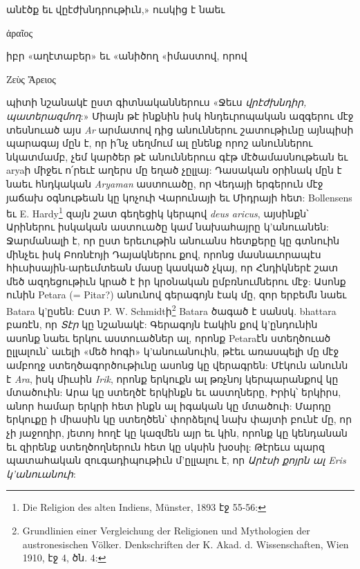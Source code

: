 \documentclass{article}
\begin{document}
{անէծք եւ վըէժխնդրութիւն,» ուսկից է նաեւ \begin{greek}ἀραῖος\end{greek} իբր «աղէտաբեր» եւ «անիծող «իմաստով, որով \begin{greek}Ζεὺς Ἄρειος\end{greek} պիտի նշանակէ ըստ գիտնականներուս «Ջեւս \emph{վրէժխնդիր, պատերազմող}:» Միայն թէ ինքնին իսկ հնդեւրոպական ազգերու մէջ տեսնուած այս \emph{Ar} արմատով դից անուններու շատութիւնը այնպիսի պարագայ մըն է, որ ի՛նչ սեղմում ալ ընենք որոշ անուններու նկատմամբ, չեմ կարծեր թէ անուններուս գէթ մէծամասնութեան եւ aryaի միջեւ ո՛րեւէ աղերս մը եղած չըլլայ: Դասական օրինակ մըն է նաեւ հնդկական \emph{Aryaman} աստուածը, որ Վեդայի երգերուն մէջ յաճախ օգնութեան կը կոչուի Վարունայի եւ Միդրայի հետ: Bollensens եւ E. Hardy\footnote{Die Religion des alten Indiens, Münster, 1893 էջ 55-56:} զայն շատ գեղեցիկ կերպով \emph{deus aricus}, այսինքն՝ Արիներու իսկական աստուածը կամ նախահայրը կ'անուանեն: Ջարմանալի է, որ ըստ երեւութին անուանս հետքերը կը գտնուին մինչեւ իսկ Բոռնէոյի Դայակներու քով, որոնց մասնաւորապէս հիւսիսային-արեւմտեան մասը կասկած չկայ, որ Հնդիկներէ շատ մեծ ազդեցութիւն կրած է իր կրօնական ըմբռնումներու մէջ: Ասոնք ունին Petara (= Pitar?) անունով գերագոյն էակ մը, զոր երբեմն նաեւ Batara կ'ըսեն: Ըստ P. W. Schmidtի\footnote{Grundlinien einer Vergleichung der Religionen und Mythologien der austronesischen Völker. Denkschriften der K. Akad. d. Wissenschaften, Wien 1910, էջ 4, ծն. 4:} Batara ծագած է սանսկ. bhattara բառէն, որ \emph{Տէր} կը նշանակէ: Գերագոյն էակին քով կ'ընդունին ասոնք նաեւ երկու աստուածներ ալ, որոնք Petaraէն ստեղծուած ըլլալուն՝ աւելի «մեծ հոգի» կ'անուանուին, թէեւ առասպելի մը մէջ ամբողջ ստեղծագործութիւնը ասոնց կը վերագրեն: Մէկուն անունն է \emph{Ara}, իսկ միւսին \emph{Irik}, որոնք երկուքն ալ թռչնոյ կերպարանքով կը մտածուին: Արա կը ստեղծէ երկինքն եւ աստղները, Իրիկ՝ երկիրս, անոր համար երկրի հետ ինքն ալ իգական կը մտածուի: Մարդը երկուքը ի միասին կը ստեղծեն՝ փորձելով նախ փայտի բունէ մը, որ չի յաջողիր, յետոյ հողէ կը կազմեն այր եւ կին, որոնք կը կենդանան եւ զիրենք ստեղծողներուն հետ կը սկսին խօսիլ: Թէրեւս պարզ պատահական զուգադիպութիւն մ'ըլլալու է, որ \emph{Արէսի քոյրն ալ Eris կ'անուանուի}:

}
\end{document}
